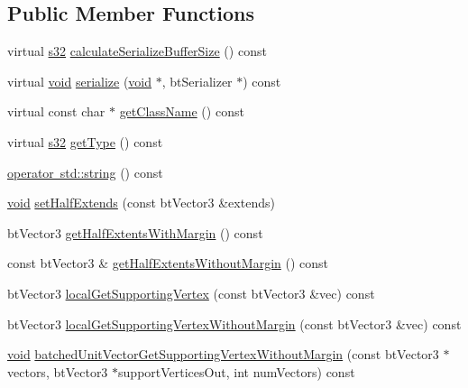 \subsection*{Public Member Functions}
\begin{DoxyCompactItemize}
\item 
virtual \mbox{\hyperlink{_util_8h_aa62c75d314a0d1f37f79c4b73b2292e2}{s32}} \mbox{\hyperlink{classnjli_1_1_physics_shape_box_a0aa7607b93e89ea9fe1c6a73e44ec1d0}{calculate\+Serialize\+Buffer\+Size}} () const
\item 
virtual \mbox{\hyperlink{_thread_8h_af1e856da2e658414cb2456cb6f7ebc66}{void}} \mbox{\hyperlink{classnjli_1_1_physics_shape_box_a3c8a170c8a0a3bb3184886d9657df74c}{serialize}} (\mbox{\hyperlink{_thread_8h_af1e856da2e658414cb2456cb6f7ebc66}{void}} $\ast$, bt\+Serializer $\ast$) const
\item 
virtual const char $\ast$ \mbox{\hyperlink{classnjli_1_1_physics_shape_box_af0500ac8a54d96ada3a3ab1b775fdd76}{get\+Class\+Name}} () const
\item 
virtual \mbox{\hyperlink{_util_8h_aa62c75d314a0d1f37f79c4b73b2292e2}{s32}} \mbox{\hyperlink{classnjli_1_1_physics_shape_box_af078fddd3770d7c3846ef74d00d613e1}{get\+Type}} () const
\item 
\mbox{\hyperlink{classnjli_1_1_physics_shape_box_aeeaae082ee5e0fcc1fe07cff9af3d940}{operator std\+::string}} () const
\item 
\mbox{\hyperlink{_thread_8h_af1e856da2e658414cb2456cb6f7ebc66}{void}} \mbox{\hyperlink{classnjli_1_1_physics_shape_box_a25c10d3f2ecac19728eb1696f566bd91}{set\+Half\+Extends}} (const bt\+Vector3 \&extends)
\item 
bt\+Vector3 \mbox{\hyperlink{classnjli_1_1_physics_shape_box_a693cafc045442dc4811f65a54e6fcfff}{get\+Half\+Extents\+With\+Margin}} () const
\item 
const bt\+Vector3 \& \mbox{\hyperlink{classnjli_1_1_physics_shape_box_abae566d1d3e1f9fe77208904eaaa4f13}{get\+Half\+Extents\+Without\+Margin}} () const
\item 
bt\+Vector3 \mbox{\hyperlink{classnjli_1_1_physics_shape_box_a90137df2c2cfd10460f1cdf657dd89bc}{local\+Get\+Supporting\+Vertex}} (const bt\+Vector3 \&vec) const
\item 
bt\+Vector3 \mbox{\hyperlink{classnjli_1_1_physics_shape_box_a6545aef4a08365f0fadd57f74c3518cb}{local\+Get\+Supporting\+Vertex\+Without\+Margin}} (const bt\+Vector3 \&vec) const
\item 
\mbox{\hyperlink{_thread_8h_af1e856da2e658414cb2456cb6f7ebc66}{void}} \mbox{\hyperlink{classnjli_1_1_physics_shape_box_a99378d684de6e94bc490521804eebb5d}{batched\+Unit\+Vector\+Get\+Supporting\+Vertex\+Without\+Margin}} (const bt\+Vector3 $\ast$vectors, bt\+Vector3 $\ast$support\+Vertices\+Out, int num\+Vectors) const

\end{DoxyCompactItemize}
